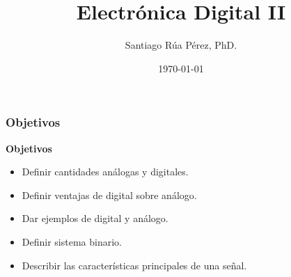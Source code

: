 \documentclass[10.5pt,scale=1.0,t,aspectratio=169,hyperref={pdfpagelabels=false}]{beamer}
\title{Electrónica Digital II}
\author{Santiago Rúa Pérez, PhD.}
\date{\today}
\begin{document}
\justify
\renewcommand{\arraystretch}{2.0}


\begin{frame}
	\titlepage
\end{frame}



\begin{frame}
	\frametitle{Objetivos}
{\bf Objetivos}
\begin{itemize}
	\item Definir cantidades análogas y digitales.
	\item Definir ventajas de digital sobre análogo.
	\item Dar ejemplos de digital y análogo.
	\item Definir sistema binario.
	\item Describir las características principales de una señal.
	
\end{itemize}
\end{frame}
\end{document}
